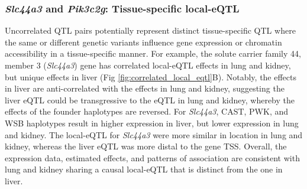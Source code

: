 \documentclass[10pt,letterpaper]{article}
\begin{document}
\subsubsection*{\textit{Slc44a3} and \textit{Pik3c2g}: Tissue-specific local-eQTL}
Uncorrelated QTL pairs potentially represent distinct tissue-specific QTL where the same or different genetic variants influence gene expression or chromatin accessibility in a tissue-specific manner. For example, the solute carrier family 44, member 3 (\textit{Slc44a3}) gene has correlated local-eQTL effects in lung and kidney, but unique effects in liver (Fig \ref{fig:correlated_local_eqtl}B). Notably, the effects in liver are anti-correlated with the effects in lung and kidney, suggesting the liver eQTL could be transgressive \cite{Rieseberg1999} to the eQTL in lung and kidney, whereby the effects of the founder haplotypes are reversed. For \textit{Slc44a3}, CAST, PWK, and WSB haplotypes result in higher expression in liver, but lower expression in lung and kidney. 
The local-eQTL for \textit{Slc44a3} were more similar in location in lung and kidney, whereas the liver eQTL was more distal to the gene TSS. Overall, the expression data, estimated effects, and patterns of association are consistent with lung and kidney sharing a causal local-eQTL that is distinct from the one in liver. 
\end{document}
